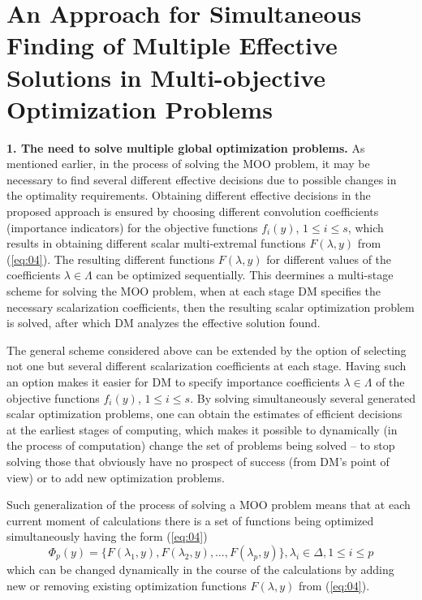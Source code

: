 \documentclass[runningheads]{llncs}
\begin{document}
\section{An Approach for Simultaneous Finding of Multiple Effective Solutions in Multi-objective Optimization Problems} \label{sec:04}

\textbf{1. The need to solve multiple global optimization problems.} As mentioned earlier, in the process of solving the MOO problem, it may be necessary to find several different effective decisions due to possible changes in the optimality requirements. Obtaining different  effective decisions in the proposed approach is ensured by choosing different convolution coefficients (importance indicators) for the objective functions $f_i(y)$, $1 \leq i \leq s$, which results in obtaining different  scalar multi-extremal functions $F(\lambda, y)$ from (\ref{eq:04}). The resulting different functions $F(\lambda, y)$ for different values of the coefficients $\lambda \in \Lambda$ can be optimized sequentially. This deermines a multi-stage scheme for solving the MOO problem, when at each stage DM specifies the necessary scalarization coefficients, then the resulting scalar optimization problem is solved, after which DM analyzes the effective solution found. 

The general scheme considered above can be extended by the option of selecting not one but several different scalarization coefficients at each stage. Having such an option makes it easier for DM  to specify importance coefficients $\lambda \in \Lambda$ of the objective functions $f_i(y)$, $1 \leq i \leq s$. By solving simultaneously several generated scalar optimization problems, one can  obtain the estimates of efficient decisions at the earliest stages of computing, which makes it possible to dynamically (in the process of computation) change the set of problems being solved -- to stop solving those that obviously have no prospect of success (from DM's point of view) or to add new optimization problems. 

Such generalization of the process of solving a MOO problem means that at each current moment of calculations there is a set of functions being optimized simultaneously having the form (\ref{eq:04})
\begin{equation}
\label{eq:21}
\Phi_p (y)=\{ F(\lambda_1,y), F(\lambda_2,y),\dots,F(\lambda_p,y)  \},  \lambda_i \in \Delta, 1 \leq i \leq p
\end{equation}
which can be changed dynamically in the course of the calculations by adding new or removing existing optimization functions $F(\lambda, y)$ from (\ref{eq:04}). 
\end{document}
